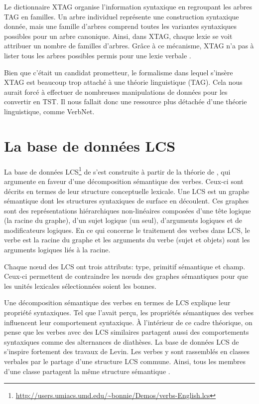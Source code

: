 Le dictionnaire XTAG organise l'information syntaxique en regroupant les arbres \ac{TAG} en familles. Un arbre individuel représente une construction syntaxique donnée, mais une famille d'arbres comprend toutes les variantes syntaxiques possibles pour un arbre canonique. Ainsi, dans XTAG, chaque lexie se voit attribuer un nombre de familles d'arbres. Grâce à ce mécanisme, XTAG n'a pas à lister tous les arbres possibles permis pour une lexie verbale \citep{DoranXTAGSystemWide1994}.

Bien que c'était un candidat prometteur, le formalisme dans lequel s'insère XTAG est beaucoup trop attaché à une théorie linguistique (\ac{TAG}). Cela nous aurait forcé à effectuer de nombreuses manipulations de données pour les convertir en \ac{TST}. Il nous fallait donc une ressource plus détachée d'une théorie linguistique, comme VerbNet.

\section{La base de données \ac{LCS}}
La base de données \ac{LCS}\footnote{\url{http://users.umiacs.umd.edu/~bonnie/Demos/verbs-English.lcs}} de \cite{DorrLCSVerbDatabase2001} s'est construite à partir de la théorie de \cite{Jackendoff1972-JACSII-2,JackendoffSemanticStructures1992}, qui argumente en faveur d'une décomposition sémantique des verbes. Ceux-ci sont décrits en termes de leur structure conceptuelle lexicale. Une LCS est un graphe sémantique dont les structures syntaxiques de surface en découlent. Ces graphes sont des représentations hiérarchiques non-linéaires composées d'une tête logique (la racine du graphe), d'un sujet logique (un seul), d'arguments logiques et de modificateurs logiques. En ce qui concerne le traitement des verbes dans LCS, le verbe est la racine du graphe et les arguments du verbe (sujet et objets) sont les arguments logiques liés à la racine.

Chaque n\oe{}ud des LCS ont trois attributs: type, primitif sémantique et champ. Ceux-ci permettent de contraindre les n\oe{}uds des graphes sémantiques pour que les unités lexicales sélectionnées soient les bonnes.

Une décomposition sémantique des verbes en termes de LCS explique leur propriété syntaxiques. Tel que \cite{verb-classes.levin.1993} l'avait perçu, les propriétés sémantiques des verbes influencent leur comportement syntaxique. À l'intérieur de ce cadre théorique, on pense que les verbes avec des LCS similaires partagent aussi des comportements syntaxiques comme des alternances de diathèses. La base de données LCS de \cite{DorrLCSVerbDatabase2001} s'inspire fortement des travaux de Levin. Les verbes y sont rassemblés en classes verbales par le partage d'une structure LCS commune. Ainsi, tous les membres d'une classe partagent la même structure sémantique \citep{TraumGenerationLexicalConceptual2000, AyanGeneratingParsingLexicon2002a}.


